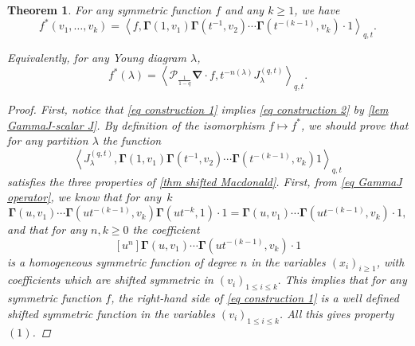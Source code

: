 \documentclass[12pt]{amsart}
\newtheorem{thm}{Theorem}[section]
\theoremstyle{remark}
\newcommand{\J}{{J}^{(q,t)}}
\newcommand{\nablaJ}{\boldsymbol{\nabla}}
\newcommand{\GammaJ}{\boldsymbol{\Gamma}}
\newcommand{\Pop}{\mathcal{P}}
\begin{document}
\begin{thm}\label{thm shifted-gamma}
    For any symmetric function $f$ and any $k\geq 1$, we have
    \begin{equation}\label{eq construction 1}
      f^*(v_1,\dots,v_k)=\left\langle f, \GammaJ(1,v_1)\GammaJ(t^{-1},v_2)\cdots\GammaJ(t^{-(k-1)},v_k)\cdot 1\right\rangle_{q,t}.  
    \end{equation}
    
Equivalently, for any Young diagram $\lambda$, 
\begin{equation}\label{eq construction 2}
    f^*(\lambda)=\left\langle\Pop_{\frac{1}{1-q}}\nablaJ\cdot f,t^{-n(\lambda)}\J_\lambda\right\rangle _{q,t}.
\end{equation}
    
\begin{proof}
First, notice that \cref{eq construction 1} implies \cref{eq construction 2} by \cref{lem GammaJ-scalar J}.
By definition of the isomorphism $f\mapsto f^*$, we should prove that for any partition $\lambda$ the function
\begin{equation}\label{eq RHS thm star-Gamma}
  \left\langle J_\lambda^{(q,t)}, \GammaJ(1,v_1)\GammaJ(t^{-1},v_2)\cdots\GammaJ(t^{-(k-1)},v_k)1\right\rangle_{q,t}
\end{equation}
satisfies the three properties of \cref{thm shifted Macdonald}.
First, from \cref{eq GammaJ operator}, we know that for any~$k$
$$\GammaJ(u,v_1)\cdots\GammaJ(ut^{-(k-1)},v_k)\GammaJ(ut^{-k},1)\cdot 1
=\GammaJ(u,v_1)\cdots\GammaJ(ut^{-(k-1)},v_k)\cdot 1,$$
and that for any $n,k\geq0$ the coefficient 
$$[u^n]\GammaJ(u,v_1)\cdots\GammaJ(ut^{-(k-1)},v_k)\cdot 1$$
is a homogeneous symmetric function of degree $n$ in the variables $(x_i)_{i\geq1}$, with coefficients which are shifted symmetric in $(v_i)_{1\leq i\leq k}.$
This implies that for any symmetric function $f$,  the right-hand side of \cref{eq construction 1} is a well defined shifted symmetric function in the variables $(v_i)_{1\leq i\leq k}$. All this gives property $(1)$. 


\end{proof}
\end{thm}
\end{document}
